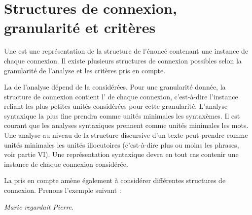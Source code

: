 \section{Structures de connexion, granularité et critères}\label{sec:3.2.18}

\begin{sloppypar}
Une  est une représentation de la structure de l’énoncé contenant une instance de chaque connexion. Il existe plusieurs structures de connexion possibles selon la granularité de l’analyse et les critères pris en compte.
\end{sloppypar}

La  de l’analyse dépend de la  considérées. Pour une granularité donnée, la structure de connexion contient l’ de chaque connexion, c’est-à-dire l’instance reliant les plus petites unités considérées pour cette granularité. L’analyse syntaxique la plus fine prendra comme unités minimales les syntaxèmes. Il est courant que les analyses syntaxiques prennent comme unités minimales les mots. Une analyse au niveau de la structure discursive d’un texte peut prendre comme unités minimales les unités illocutoires (c’est-à-dire plus ou moins les phrases, voir partie VI). Une représentation syntaxique devra en tout cas contenir une instance de chaque connexion considérée.

La  pris en compte amène également à considérer différentes structures de connexion. Prenons l’exemple suivant :

\ea \textit{Marie regardait Pierre}.\label{ex:regardait}\z

